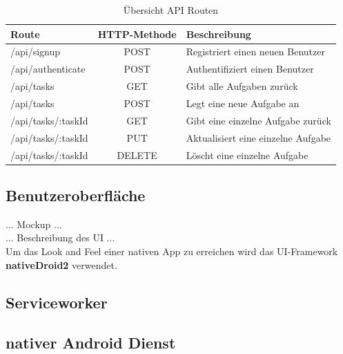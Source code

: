 \begin{table}[h]
\centering
\begin{tabular}{l | c | l }
    \textbf{Route} & \textbf{HTTP-Methode} & \textbf{Beschreibung} \\
    \hline\hline
    /api/signup & POST & Registriert einen neuen Benutzer \\
    /api/authenticate & POST & Authentifiziert einen Benutzer \\
    \hline
    /api/tasks & GET & Gibt alle Aufgaben zurück \\
    /api/tasks & POST & Legt eine neue Aufgabe an \\
    /api/tasks/:taskId & GET & Gibt eine einzelne Aufgabe zurück \\
    /api/tasks/:taskId & PUT & Aktualisiert eine einzelne Aufgabe \\
    /api/tasks/:taskId & DELETE & Löscht eine einzelne Aufgabe \\
\end{tabular}
\caption{Übersicht API Routen}
\label{tbl_api-routes}
\end{table}

\subsection{Benutzeroberfläche}

... Mockup ... \\
... Beschreibung des UI ...\\

Um das \glqq{}Look and Feel\grqq{} einer nativen App zu erreichen wird das UI-Framework \textbf{nativeDroid2} verwendet. \\

\subsection{Serviceworker}


\subsection{nativer Android Dienst}